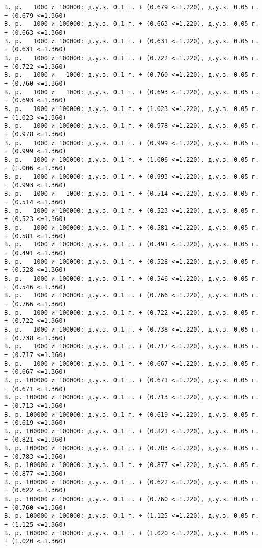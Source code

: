 \documentclass[11pt]{article}
\begin{document}
{\begin{Verbatim}[commandchars=\\\{\}]
В. р.   1000 и 100000: д.у.з. 0.1 г. + (0.679 <=1.220), д.у.з. 0.05 г. + (0.679 <=1.360)
В. р.   1000 и 100000: д.у.з. 0.1 г. + (0.663 <=1.220), д.у.з. 0.05 г. + (0.663 <=1.360)
В. р.   1000 и 100000: д.у.з. 0.1 г. + (0.631 <=1.220), д.у.з. 0.05 г. + (0.631 <=1.360)
В. р.   1000 и 100000: д.у.з. 0.1 г. + (0.722 <=1.220), д.у.з. 0.05 г. + (0.722 <=1.360)
В. р.   1000 и   1000: д.у.з. 0.1 г. + (0.760 <=1.220), д.у.з. 0.05 г. + (0.760 <=1.360)
В. р.   1000 и   1000: д.у.з. 0.1 г. + (0.693 <=1.220), д.у.з. 0.05 г. + (0.693 <=1.360)
В. р.   1000 и 100000: д.у.з. 0.1 г. + (1.023 <=1.220), д.у.з. 0.05 г. + (1.023 <=1.360)
В. р.   1000 и 100000: д.у.з. 0.1 г. + (0.978 <=1.220), д.у.з. 0.05 г. + (0.978 <=1.360)
В. р.   1000 и 100000: д.у.з. 0.1 г. + (0.999 <=1.220), д.у.з. 0.05 г. + (0.999 <=1.360)
В. р.   1000 и 100000: д.у.з. 0.1 г. + (1.006 <=1.220), д.у.з. 0.05 г. + (1.006 <=1.360)
В. р.   1000 и 100000: д.у.з. 0.1 г. + (0.993 <=1.220), д.у.з. 0.05 г. + (0.993 <=1.360)
В. р.   1000 и   1000: д.у.з. 0.1 г. + (0.514 <=1.220), д.у.з. 0.05 г. + (0.514 <=1.360)
В. р.   1000 и 100000: д.у.з. 0.1 г. + (0.523 <=1.220), д.у.з. 0.05 г. + (0.523 <=1.360)
В. р.   1000 и 100000: д.у.з. 0.1 г. + (0.581 <=1.220), д.у.з. 0.05 г. + (0.581 <=1.360)
В. р.   1000 и 100000: д.у.з. 0.1 г. + (0.491 <=1.220), д.у.з. 0.05 г. + (0.491 <=1.360)
В. р.   1000 и 100000: д.у.з. 0.1 г. + (0.528 <=1.220), д.у.з. 0.05 г. + (0.528 <=1.360)
В. р.   1000 и 100000: д.у.з. 0.1 г. + (0.546 <=1.220), д.у.з. 0.05 г. + (0.546 <=1.360)
В. р.   1000 и 100000: д.у.з. 0.1 г. + (0.766 <=1.220), д.у.з. 0.05 г. + (0.766 <=1.360)
В. р.   1000 и 100000: д.у.з. 0.1 г. + (0.722 <=1.220), д.у.з. 0.05 г. + (0.722 <=1.360)
В. р.   1000 и 100000: д.у.з. 0.1 г. + (0.738 <=1.220), д.у.з. 0.05 г. + (0.738 <=1.360)
В. р.   1000 и 100000: д.у.з. 0.1 г. + (0.717 <=1.220), д.у.з. 0.05 г. + (0.717 <=1.360)
В. р.   1000 и 100000: д.у.з. 0.1 г. + (0.667 <=1.220), д.у.з. 0.05 г. + (0.667 <=1.360)
В. р. 100000 и 100000: д.у.з. 0.1 г. + (0.671 <=1.220), д.у.з. 0.05 г. + (0.671 <=1.360)
В. р. 100000 и 100000: д.у.з. 0.1 г. + (0.713 <=1.220), д.у.з. 0.05 г. + (0.713 <=1.360)
В. р. 100000 и 100000: д.у.з. 0.1 г. + (0.619 <=1.220), д.у.з. 0.05 г. + (0.619 <=1.360)
В. р. 100000 и 100000: д.у.з. 0.1 г. + (0.821 <=1.220), д.у.з. 0.05 г. + (0.821 <=1.360)
В. р. 100000 и 100000: д.у.з. 0.1 г. + (0.783 <=1.220), д.у.з. 0.05 г. + (0.783 <=1.360)
В. р. 100000 и 100000: д.у.з. 0.1 г. + (0.877 <=1.220), д.у.з. 0.05 г. + (0.877 <=1.360)
В. р. 100000 и 100000: д.у.з. 0.1 г. + (0.622 <=1.220), д.у.з. 0.05 г. + (0.622 <=1.360)
В. р. 100000 и 100000: д.у.з. 0.1 г. + (0.760 <=1.220), д.у.з. 0.05 г. + (0.760 <=1.360)
В. р. 100000 и 100000: д.у.з. 0.1 г. + (1.125 <=1.220), д.у.з. 0.05 г. + (1.125 <=1.360)
В. р. 100000 и 100000: д.у.з. 0.1 г. + (1.020 <=1.220), д.у.з. 0.05 г. + (1.020 <=1.360)
\end{Verbatim}
}
\end{document}
